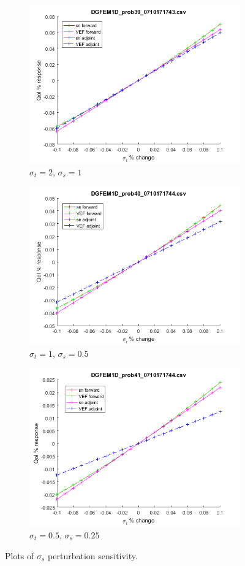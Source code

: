\documentclass{article}
\newcommand{\sigt}{\sigma_t}
\newcommand{\sigs}{\sigma_s}
\begin{document}
\begin{figure}[H]
\label{InHomoPerts}
\centering
\begin{subfigure}{.5\textwidth}
  \centering
  \includegraphics[width=.8\linewidth]{figures/39sigsSens.png}
  \caption{$\sigt=2$, $\sigs=1$}
  \label{fig:sfig1}
\end{subfigure}%
\begin{subfigure}{.5\textwidth}
  \centering
  \includegraphics[width=.8\linewidth]{figures/40sigsSens.png}
  \caption{$\sigt=1$, $\sigs=0.5$}
  \label{fig:sfig2}
\end{subfigure}
\begin{subfigure}{.5\textwidth}
  \centering
  \includegraphics[width=.8\linewidth]{figures/41sigsSens.png}
  \caption{$\sigt=0.5$, $\sigs=0.25$}
  \label{fig:sfig3}
\end{subfigure}
\caption{Plots of $\sigs$ perturbation sensitivity.}
\label{fig:fig}
\end{figure}
\end{document}
